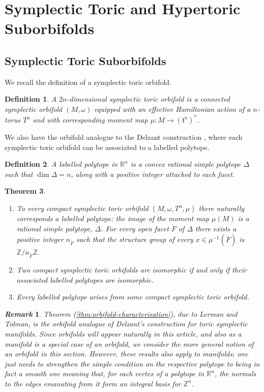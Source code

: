 \documentclass{amsart}
\newtheorem{theorem}{Theorem}[section]
\newtheorem{defn}[theorem]{Definition\rm}
\newtheorem{remark}{\it Remark\/}
\newcommand{\ra}{\rightarrow}
\newcommand{\w}{\omega}
\newcommand{\RR}{\mathbb{R}}
\newcommand{\ZZ}{\mathbb{Z}}
\newcommand{\mft}{\mathfrak{t}}
\newcommand{\open}[1]{\mathring{#1}}
\begin{document}
	\section{Symplectic Toric and Hypertoric Suborbifolds}
	
	\subsection{Symplectic Toric Suborbifolds}
	
	We recall the definition of a symplectic toric orbifold.
	
	\begin{defn}{\cite{Aud04,Lerman1997}}
		A $2n$-dimensional \emph{symplectic toric orbifold} is a connected symplectic orbifold $(M, \w)$ equipped with an effective Hamiltonian action of a $n$-torus $T^{n}$ and with corresponding moment map $\mu : M \ra (\mft^{n})^{\ast}$.
	\end{defn}

	We also have the orbifold analogue to the Delzant construction \cite{Del88}, where each symplectic toric orbifold can be associated to a labelled polytope.
	
	\begin{defn}{\cite{Lerman1997}}
		A \emph{labelled polytope} in $\RR^{n}$ is a convex rational simple polytope $\Delta$ such that $\dim\Delta = n$, along with a positive integer attached to each facet.
	\end{defn}

	\begin{theorem}{\cite{Lerman1997}}
		\begin{enumerate}\label{thm:orbifold-characterisation}
			\item To every compact symplectic toric orbifold $(M, \w, T^{n}, \mu)$ there naturally corresponds a labelled polytope: the image of the moment map $\mu(M)$ is a rational simple polytope, $\Delta$. For every open facet $\open{F}$ of $\Delta$ there exists a positive integer $n_{\open{F}}$ such that the structure group of every $x \in \mu^{-1}(\open{F})$ is $\ZZ/n_{\open{F}}\ZZ$.
			\item Two compact symplectic toric orbifolds are isomorphic if and only if their associated labelled polytopes are isomorphic.
			\item Every labelled polytope arises from some compact symplectic toric orbifold.
		\end{enumerate}
	\end{theorem}

	\begin{remark}
		Theorem (\ref{thm:orbifold-characterisation}), due to Lerman and Tolman, is the orbifold analogue of Delzant's construction for toric symplectic manifolds. Since orbifolds will appear naturally in this article, and also as a manifold is a special case of an orbifold, we consider the more general notion of an orbifold in this section. However, these results also apply to manifolds; one just needs to strengthen the simple condition on the respective polytope to being in fact a \emph{smooth} one meaning that, for each vertex of a polytope in $\RR^{n}$, the normals to the edges emanating from it form an integral basis for $\ZZ^{n}$.
	\end{remark}
	
\end{document}
